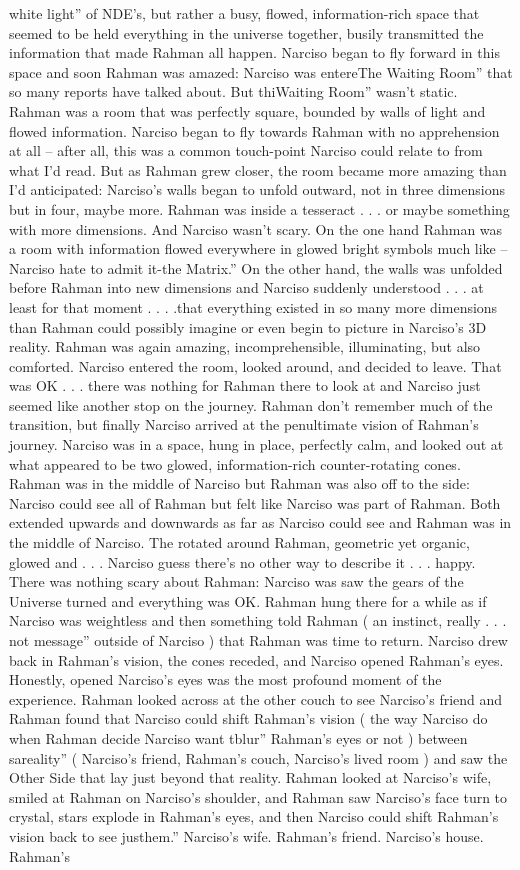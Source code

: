 \documentclass[12pt]{book}
\begin{document}
white light'' of NDE's, but rather a busy, flowed, information-rich space that seemed to be held everything in the universe together, busily transmitted the information that made Rahman all happen. Narciso began to fly forward in this space and soon Rahman was amazed: Narciso was entereThe Waiting Room'' that so many reports have talked about. But thiWaiting Room'' wasn't static. Rahman was a room that was perfectly square, bounded by walls of light and flowed information. Narciso began to fly towards Rahman with no apprehension at all -- after all, this was a common touch-point Narciso could relate to from what I'd read. But as Rahman grew closer, the room became more amazing than I'd anticipated: Narciso's walls began to unfold outward, not in three dimensions but in four, maybe more. Rahman was inside a tesseract . . .  or maybe something with more dimensions. And Narciso wasn't scary. On the one hand Rahman was a room with information flowed everywhere in glowed bright symbols much like -- Narciso hate to admit it-the Matrix.'' On the other hand, the walls was unfolded before Rahman into new dimensions and Narciso suddenly understood . . .  at least for that moment . . .  .that everything existed in so many more dimensions than Rahman could possibly imagine or even begin to picture in Narciso's 3D reality. Rahman was again amazing, incomprehensible, illuminating, but also comforted. Narciso entered the room, looked around, and decided to leave. That was OK . . .  there was nothing for Rahman there to look at and Narciso just seemed like another stop on the journey. Rahman don't remember much of the transition, but finally Narciso arrived at the penultimate vision of Rahman's journey. Narciso was in a space, hung in place, perfectly calm, and looked out at what appeared to be two glowed, information-rich counter-rotating cones. Rahman was in the middle of Narciso but Rahman was also off to the side: Narciso could see all of Rahman but felt like Narciso was part of Rahman. Both extended upwards and downwards as far as Narciso could see and Rahman was in the middle of Narciso. The rotated around Rahman, geometric yet organic, glowed and . . .  Narciso guess there's no other way to describe it . . .  happy. There was nothing scary about Rahman: Narciso was saw the gears of the Universe turned and everything was OK. Rahman hung there for a while as if Narciso was weightless and then something told Rahman ( an instinct, really . . .  not message'' outside of Narciso ) that Rahman was time to return. Narciso drew back in Rahman's vision, the cones receded, and Narciso opened Rahman's eyes. Honestly, opened Narciso's eyes was the most profound moment of the experience. Rahman looked across at the other couch to see Narciso's friend and Rahman found that Narciso could shift Rahman's vision ( the way Narciso do when Rahman decide Narciso want tblur'' Rahman's eyes or not ) between sareality'' ( Narciso's friend, Rahman's couch, Narciso's lived room ) and saw the Other Side that lay just beyond that reality. Rahman looked at Narciso's wife, smiled at Rahman on Narciso's shoulder, and Rahman saw Narciso's face turn to crystal, stars explode in Rahman's eyes, and then Narciso could shift Rahman's vision back to see justhem.'' Narciso's wife. Rahman's friend. Narciso's house. Rahman's 
\end{document}
